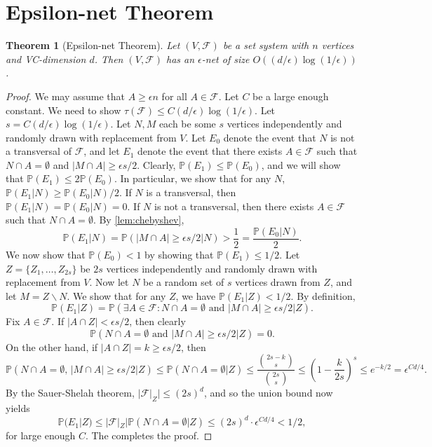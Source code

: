 \documentclass[12pt,reqno]{amsart}
\newtheorem{theorem}{Theorem}[section]
\theoremstyle{definition}
\theoremstyle{remark}
\renewcommand{\leq}{\leqslant}
\renewcommand{\geq}{\geqslant}
\def\F{\mathcal{F}}
\def\P{\mathbb{P}}
\numberwithin{equation}{section}
\begin{document}
\section{Epsilon-net Theorem}

\begin{theorem}[Epsilon-net Theorem]
	Let $(V, \F)$ be a set system with $n$ vertices and VC-dimension $d$. Then $(V, \F)$ has an $\epsilon$-net of size $O((d/\epsilon)\log(1/\epsilon))$.
\end{theorem}

\begin{proof}
	We may assume that $A \geq \epsilon n$ for all $A \in \F$. Let $C$ be a large enough constant. We need to show $\tau(\F) \leq C(d/\epsilon)\log(1/\epsilon)$. Let $s = C(d/\epsilon)\log(1/\epsilon)$. Let $N, M$ each be some $s$ vertices independently and randomly drawn with replacement from $V$. Let $E_0$ denote the event that $N$ is not a transversal of $\F$, and let $E_1$ denote the event that there exists $A \in \F$ such that $N \cap A = \emptyset$ and $|M \cap A| \geq \epsilon s/2$. Clearly, $\mathbb{P}(E_1) \leq \mathbb{P}(E_0)$, and we will show that $\mathbb{P}(E_1) \leq 2\mathbb{P}(E_0)$. In particular, we show that for any $N$, $\P(E_1|N) \geq \P(E_0|N)/2$. If $N$ is a transversal, then $\P(E_1|N) = \P(E_0|N) = 0$. If $N$ is not a transversal, then there exists $A \in \F$ such that $N \cap A = \emptyset$. By \cref{lem:chebyshev},
	\[
		\P(E_1|N) = \P(|M \cap A| \geq \epsilon s/2|N) > \frac{1}{2} = \frac{\P(E_0|N)}{2}.
	\]
	We now show that $\P(E_0) < 1$ by showing that $\P(E_1) \leq 1/2$. Let $Z = \{Z_1, \ldots, Z_{2s}\}$ be $2s$ vertices independently and randomly drawn with replacement from $V$. Now let $N$ be a random set of $s$ vertices drawn from $Z$, and let $M = Z \backslash N$. We show that for any $Z$, we have $\P(E_1|Z) < 1/2$. By definition,
	\[
		\P(E_1|Z) = \P(\exists A \in \F: N \cap A = \emptyset \text{ and } |M \cap A| \geq \epsilon s/2|Z).
	\]
	Fix $A \in \F$. If $|A \cap Z| < \epsilon s/2$, then clearly
	\[
		\P(N \cap A = \emptyset \text{ and } |M \cap A| \geq \epsilon s/2|Z) = 0.
	\]
	On the other hand, if $|A \cap Z| = k \geq \epsilon s/2$, then
	\[
		\P(N \cap A = \emptyset, \, |M \cap A| \geq \epsilon s/2|Z) \leq \P(N \cap A = \emptyset|Z) \leq \frac{\binom{2s - k}{s}}{\binom{2s}{s}} \leq \left(1 - \frac{k}{2s}\right)^s \leq e^{-k/2} = \epsilon^{Cd/4}.
	\]
	By the Sauer-Shelah theorem, $|\F|_Z| \leq (2s)^d$, and so the union bound now yields
	\[
		\P(E_1|Z) \leq |\F|_Z|\P(N \cap A = \emptyset|Z) \leq (2s)^d \cdot \epsilon^{Cd/4} < 1/2,
	\]
	for large enough $C$. The completes the proof.
\end{proof}
\end{document}
